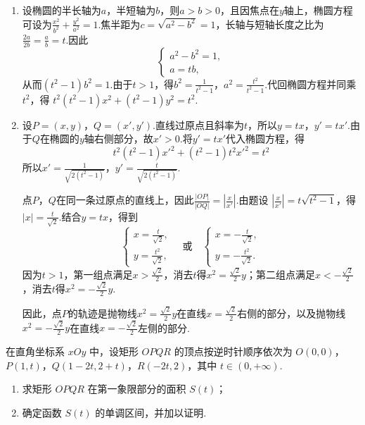 \documentclass[UTF8,a4paper,oneside,11pt]{ctexbook}
\begin{document}
\begin{solution}
\begin{enumerate}
\item 设椭圆的半长轴为\(a\)，半短轴为\(b\)，则\(a>b>0\)，且因焦点在\(y\)轴上，椭圆方程可设为\(\frac{x^2}{b^2}+\frac{y^2}{a^2}=1\).焦半距为\(c=\sqrt{a^2-b^2}=1\)，长轴与短轴长度之比为\(\frac{2a}{2b}=\frac{a}{b}=t\).因此
\[
\begin{cases}
a^2-b^2=1,\\
a=tb,
\end{cases}
\]
从而\((t^2-1)b^2=1\).由于\(t>1\)，得\(b^2=\frac{1}{t^2-1}\)，\(a^2=\frac{t^2}{t^2-1}\).代回椭圆方程并同乘\(t^2\)，得
\(t^2(t^2-1)x^2+(t^2-1)y^2=t^2\).

\item 设\(P=(x,y)\)，\(Q=(x',y')\).直线过原点且斜率为\(t\)，所以\(y=tx\)，\(y'=tx'\).由于\(Q\)在椭圆的\(y\)轴右侧部分，故\(x'>0\).将\(y'=tx'\)代入椭圆方程，得
\[
t^2(t^2-1)x'^2+(t^2-1)t^2x'^2=t^2
\]
所以\(x'=\frac{1}{\sqrt{2(t^2-1)}}\)，\(y'=\frac{t}{\sqrt{2(t^2-1)}}\).

点\(P\)，\(Q\)在同一条过原点的直线上，因此\(\frac{|OP|}{|OQ|}=\left|\frac{x}{x'}\right|\).由题设
\(\left|\frac{x}{x'}\right|=t\sqrt{t^2-1}\)，得\(|x|=\frac{t}{\sqrt2}\).结合\(y=tx\)，得到
\[
\begin{cases}
x=\frac{t}{\sqrt2},\\
y=\frac{t^2}{\sqrt2},
\end{cases}
\quad\text{或}\quad
\begin{cases}
x=-\frac{t}{\sqrt2},\\
y=-\frac{t^2}{\sqrt2}.
\end{cases}
\]
因为\(t>1\)，第一组点满足\(x>\frac{\sqrt2}{2}\)，消去\(t\)得\(x^2=\frac{\sqrt2}{2}y\)；第二组点满足\(x< -\frac{\sqrt2}{2}\)，消去\(t\)得\(x^2=-\frac{\sqrt2}{2}y\).

因此，点\(P\)的轨迹是抛物线\(x^2=\frac{\sqrt2}{2}y\)在直线\(x=\frac{\sqrt2}{2}\)右侧的部分，以及抛物线\(x^2=-\frac{\sqrt2}{2}y\)在直线\(x=-\frac{\sqrt2}{2}\)左侧的部分.
\end{enumerate}
\end{solution}

\begin{problem}
在直角坐标系 \(xOy\) 中，设矩形 \(OPQR\) 的顶点按逆时针顺序依次为 \(O(0,0)\)，\(P(1,t)\)，\(Q(1-2t,2+t)\)，\(R(-2t,2)\)，其中 \(t \in (0,+\infty)\).
\begin{enumerate}
\item 求矩形 \(OPQR\) 在第一象限部分的面积 \(S(t)\)；
\item 确定函数 \(S(t)\) 的单调区间，并加以证明.
\end{enumerate}
\end{problem}
\end{document}
